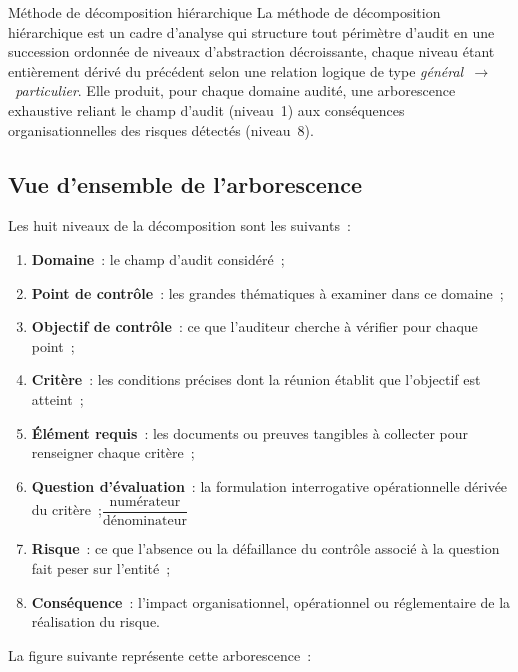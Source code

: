 \begin{boxdef}{Méthode de décomposition hiérarchique}
La méthode de décomposition hiérarchique est un cadre d'analyse qui structure
tout périmètre d'audit en une succession ordonnée de niveaux d'abstraction
décroissante, chaque niveau étant entièrement dérivé du précédent selon une
relation logique de type \emph{général~$\to$~particulier}. Elle produit, pour
chaque domaine audité, une arborescence exhaustive reliant le champ d'audit
(niveau~1) aux conséquences organisationnelles des risques détectés (niveau~8).
\end{boxdef}

\subsection{Vue d'ensemble de l'arborescence}

Les huit niveaux de la décomposition sont les suivants~:

\begin{enumerate}
  \item \textbf{Domaine}~:  le champ d'audit considéré~;
  \item \textbf{Point de contrôle}~:  les grandes thématiques à examiner dans
        ce domaine~;
  \item \textbf{Objectif de contrôle}~:  ce que l'auditeur cherche à vérifier
        pour chaque point~;
  \item \textbf{Critère}~:  les conditions précises dont la réunion établit
        que l'objectif est atteint~;
  \item \textbf{Élément requis}~:  les documents ou preuves tangibles à
        collecter pour renseigner chaque critère~;
  \item \textbf{Question d'évaluation}~:  la formulation interrogative
        opérationnelle dérivée du critère~;$\dfrac{\text{numérateur}}{\text{dénominateur}}$
  \item \textbf{Risque}~:  ce que l'absence ou la défaillance du contrôle
        associé à la question fait peser sur l'entité~;
  \item \textbf{Conséquence}~:  l'impact organisationnel, opérationnel ou
        réglementaire de la réalisation du risque.
\end{enumerate}

La figure suivante représente cette arborescence~:

